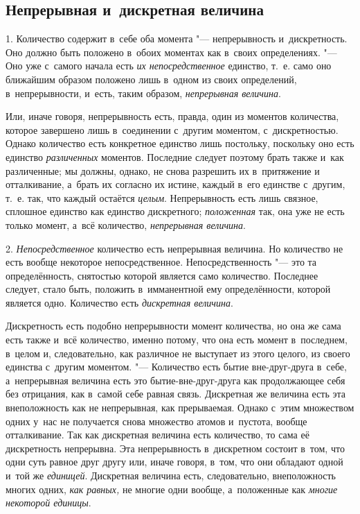 \subsection{Непрерывная и~дискретная величина}

1. Количество содержит в~себе оба момента "--- непрерывность и~дискретность.
Оно должно быть положено в~обоих моментах как в~своих определениях. "--- Оно
уже с~самого начала есть {\em их непосредственное} единство, т.~е. само оно
ближайшим образом положено лишь в~одном из своих определений, в~непрерывности,
и~есть, таким образом, {\em непрерывная величина}.

Или, иначе говоря, непрерывность есть, правда, один из моментов количества,
которое завершено лишь в~соединении с~другим моментом, с~дискретностью. Однако
количество есть конкретное единство лишь постольку, поскольку оно есть единство
{\em различенных} моментов. Последние следует поэтому брать также и~как
различенные; мы должны, однако, не снова разрешить их в~притяжение и
отталкивание, а~брать их согласно их истине, каждый в~его единстве с~другим,
т.~е. так, что каждый остаётся {\em целым}. Непрерывность есть лишь связное,
сплошное единство как единство дискретного; {\em положенная} так, она уже не
есть только момент, а~всё количество, {\em непрерывная величина}.

2. {\em Непосредственное} количество есть непрерывная величина. Но количество
не есть вообще некоторое непосредственное. Непосредственность "--- это та
определённость, снятостью которой является само количество. Последнее следует,
стало быть, положить в~имманентной ему определённости, которой является одно.
Количество есть {\em дискретная величина}.

Дискретность есть подобно непрерывности момент количества, но она же сама есть
также и~всё количество, именно потому, что она есть момент в~последнем, в~целом
и, следовательно, как различное не выступает из этого целого, из своего
единства с~другим моментом. "--- Количество есть бытие вне-друг-друга в~себе,
а~непрерывная величина есть это бытие-вне-друг-друга как продолжающее себя без
отрицания, как в~самой себе равная связь. Дискретная же величина есть эта
внеположность как не непрерывная, как прерываемая. Однако с~этим множеством
одних у~нас не получается снова множество атомов и~пустота, вообще
отталкивание. Так как дискретная величина есть количество, то сама её
дискретность непрерывна. Эта непрерывность в~дискретном состоит в~том, что одни
суть равное друг другу или, иначе говоря, в~том, что они обладают одной и~той
же {\em единицей}. Дискретная величина есть, следовательно, внеположность
многих одних, {\em как равных,} не многие одни вообще, а~положенные как
{\em многие некоторой единицы}.

